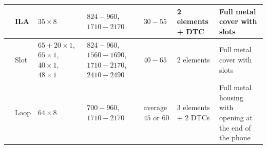 \begin{table}
\begin{tabular}{|M{0.08\textheight}|M{0.13\textheight}|M{0.09\textheight}|M{0.15\textheight}|M{0.13\textheight}|M{0.14\textheight}|M{0.16\textheight}|}
    \hline
    \cite{wu_tunable} & ILA & $35\times8$ & $824-960$, $1710-2170$ & $30-55$ & 2 elements + DTC & Full metal cover with slots\\
    \hline
    \cite{zhong_pier} & Slot & $65+20\times1$, $65\times1$, $40\times1$, $48\times1$ & $824-960$, $1560-1690$, $1710-2170$, $2410-2490$ & $40-65$ & 2 elements & Full metal cover with slots\\
    \hline
    \cite{chen_compact_lte} & Loop & $64\times8$ & $700-960$, $1710-2170$ & average $45$ or $60$ & 3 elements + 2 DTCs & Full metal housing with opening at the end of the phone\\
    \hline
\end{tabular}
\end{table}

\clearpage